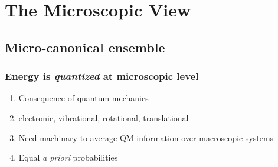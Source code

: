 \documentclass[11pt]{article}
\begin{document}
\section{The Microscopic View}
\label{sec:orgf96cf0d}
\subsection{Micro-canonical ensemble}
\label{sec:orgd76f5d1}
\subsubsection{Energy is \emph{quantized} at microscopic level}
\label{sec:org7537312}
\begin{enumerate}
\item Consequence of quantum mechanics
\item electronic, vibrational, rotational, translational
\item Need machinary to average QM information over macroscopic systems
\item Equal \emph{a priori} probabilities
\end{enumerate}
\end{document}
